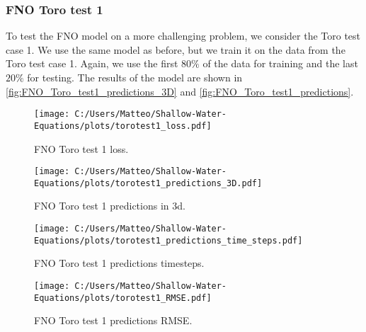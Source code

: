 \subsubsection{FNO Toro test 1}
To test the FNO model on a more challenging problem, we consider the Toro test case 1.
We use the same model as before, but we train it on the data from the Toro test case 1.
Again, we use the first $80\%$ of the data for training and the last $20\%$ for testing.
The results of the model are shown in \autoref{fig:FNO_Toro_test1_predictions_3D} and \autoref{fig:FNO_Toro_test1_predictions}.

\begin{figure}[H]
    \centering
    \texttt{[image: C:/Users/Matteo/Shallow-Water-Equations/plots/torotest1\_loss.pdf]}
    \caption{FNO Toro test 1 loss.}\label{fig:FNO_Toro_test1_loss}
\end{figure}

\begin{figure}[H]
    \centering
    \texttt{[image: C:/Users/Matteo/Shallow-Water-Equations/plots/torotest1\_predictions\_3D.pdf]}
    \caption{FNO Toro test 1 predictions in 3d.}\label{fig:FNO_Toro_test1_predictions_3D}
\end{figure}


\begin{figure}[H]
    \centering
    \texttt{[image: C:/Users/Matteo/Shallow-Water-Equations/plots/torotest1\_predictions\_time\_steps.pdf]}
    \caption{FNO Toro test 1 predictions timesteps.}\label{fig:FNO_Toro_test1_predictions_time_steps}
\end{figure}


\begin{figure}[H]
    \centering
    \texttt{[image: C:/Users/Matteo/Shallow-Water-Equations/plots/torotest1\_RMSE.pdf]}
    \caption{FNO Toro test 1 predictions RMSE.}\label{fig:FNO_Toro_test1_rmse}
\end{figure}

\newpage

